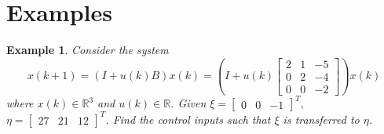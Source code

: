\documentclass[journal,a4paper,12pt,onecolumn]{IEEEtran}
\newtheorem{example}[theorem]{Example}
\begin{document}
$\left. {}\right. $

\section{Examples}

\begin{example}
Consider the system\begin{equation}
x\left( k+1\right) =\left( I+u\left( k\right) B\right) x\left( k\right)
=\left( I+u\left( k\right) \left[
\begin{array}{ccc}
2 & 1 & -5 \\
0 & 2 & -4 \\
0 & 0 & -2\end{array}\right] \right) x\left( k\right)
\end{equation}where $x\left( k\right) \in
\mathbb{R}
^{3}$ and $u\left( k\right) \in
\mathbb{R}
$. Given $\xi =\left[
\begin{array}{ccc}
0 & 0 & -1\end{array}\right] ^{T},$ $\eta =\left[
\begin{array}{ccc}
27 & 21 & 12\end{array}\right] ^{T}$. Find the control inputs such that $\xi $ is transferred to $\eta $.
\end{example}

$\left. {}\right. $
\end{document}
